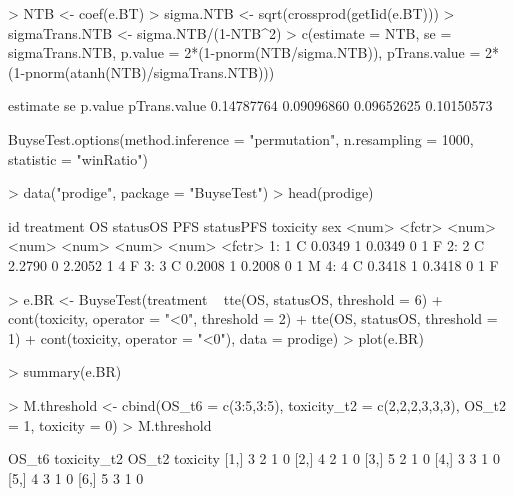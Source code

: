 \documentclass[12pt]{article}
\theoremstyle{definition}
\begin{document}
\begin{Rcode}
> NTB <- coef(e.BT)
> sigma.NTB <- sqrt(crossprod(getIid(e.BT)))
> sigmaTrans.NTB <- sigma.NTB/(1-NTB^2)
> c(estimate = NTB, se = sigmaTrans.NTB, p.value = 2*(1-pnorm(NTB/sigma.NTB)),
    pTrans.value = 2*(1-pnorm(atanh(NTB)/sigmaTrans.NTB)))
\end{Rcode}

\begin{Routput}
  estimate           se      p.value pTrans.value 
0.14787764   0.09096860   0.09652625   0.10150573 
\end{Routput}


\begin{Rcode}
BuyseTest.options(method.inference = "permutation", n.resampling = 1000,
                  statistic = "winRatio")
\end{Rcode}


\begin{Rcode}
> data("prodige", package = "BuyseTest")
> head(prodige)
\end{Rcode}

\begin{Routput}
    id treatment     OS statusOS    PFS statusPFS toxicity    sex
<num>    <fctr>  <num>    <num>  <num>     <num>    <num> <fctr>
1:     1         C 0.0349        1 0.0349         0        1      F
2:     2         C 2.2790        0 2.2052         1        4      F
3:     3         C 0.2008        1 0.2008         0        1      M
4:     4         C 0.3418        1 0.3418         0        1      F
\end{Routput}

\begin{Rcode}
> e.BR <- BuyseTest(treatment ~ tte(OS, statusOS, threshold = 6)
                + cont(toxicity, operator = "<0", threshold = 2) 
                + tte(OS, statusOS, threshold = 1) 
                + cont(toxicity, operator = "<0"), 
                    data = prodige)
> plot(e.BR)
\end{Rcode}

\begin{Rcode}
> summary(e.BR)
\end{Rcode}

\begin{Rcode}
> M.threshold <- cbind(OS_t6 = c(3:5,3:5),
                       toxicity_t2 = c(2,2,2,3,3,3),
                       OS_t2 = 1,
                       toxicity = 0)
> M.threshold
\end{Rcode}
\begin{Routput}
     OS_t6 toxicity_t2 OS_t2 toxicity
[1,]     3           2     1        0
[2,]     4           2     1        0
[3,]     5           2     1        0
[4,]     3           3     1        0
[5,]     4           3     1        0
[6,]     5           3     1        0
\end{Routput}
\end{document}
